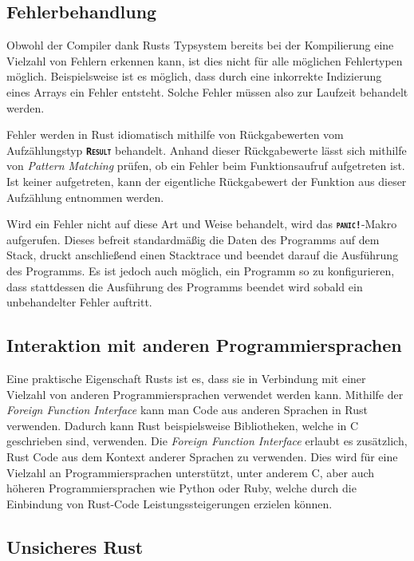 \subsection{Fehlerbehandlung}\label{sec:error_handling}

Obwohl der Compiler dank Rusts Typsystem bereits bei der Kompilierung eine Vielzahl von Fehlern erkennen kann,
ist dies  nicht für alle möglichen Fehlertypen möglich. Beispielsweise ist es möglich, dass
durch eine inkorrekte Indizierung eines Arrays ein Fehler entsteht.
Solche Fehler müssen also zur Laufzeit behandelt werden.\cite{rustBook}

Fehler werden in Rust idiomatisch mithilfe von Rückgabewerten vom Aufzählungstyp \texttt{\textsc{\textbf{Result}}}
behandelt. Anhand dieser Rückgabewerte lässt sich mithilfe von
\textit{Pattern Matching} prüfen, ob ein Fehler beim Funktionsaufruf aufgetreten ist. Ist keiner aufgetreten,
kann der eigentliche Rückgabewert der Funktion aus dieser Aufzählung entnommen werden.
\cite{rustBook}

Wird ein Fehler nicht auf diese Art und Weise behandelt, wird das \texttt{\textsc{\textbf{panic!}}}-Makro
aufgerufen. Dieses befreit standardmäßig die Daten des Programms auf dem Stack, druckt anschließend einen
Stacktrace und beendet darauf die Ausführung des Programms.
Es ist jedoch auch möglich, ein Programm so zu konfigurieren,
dass stattdessen die Ausführung des Programms beendet wird sobald ein unbehandelter Fehler auftritt.\cite{rustBook}

\subsection{Interaktion mit anderen Programmiersprachen}

Eine praktische Eigenschaft Rusts ist es, dass sie in Verbindung mit einer Vielzahl von anderen Programmiersprachen
verwendet werden kann. Mithilfe der \textit{Foreign Function Interface} kann man Code aus anderen
Sprachen in Rust verwenden. Dadurch kann Rust beispielsweise Bibliotheken, welche in C geschrieben sind, verwenden.
Die \textit{Foreign Function Interface} erlaubt es zusätzlich, Rust Code aus dem Kontext anderer Sprachen zu
verwenden. Dies wird für eine Vielzahl an Programmiersprachen unterstützt, unter anderem C, aber auch höheren
Programmiersprachen wie Python oder Ruby, welche durch die Einbindung von Rust-Code Leistungssteigerungen erzielen können.\cite{firstRustBook}\cite{rustBook-1.2.0}

\subsection{Unsicheres Rust}

